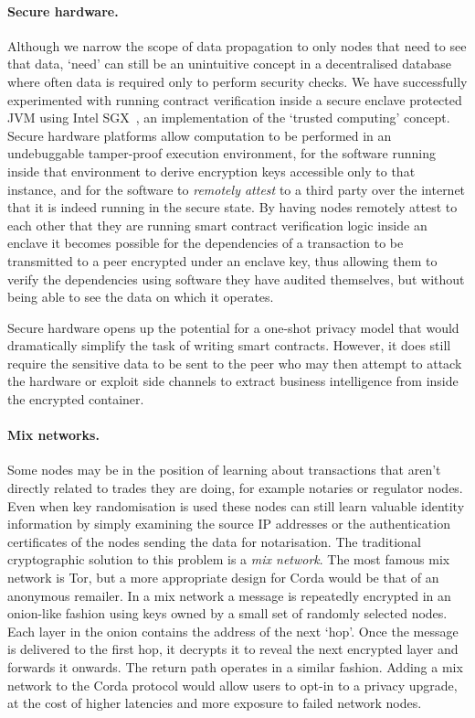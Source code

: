 \documentclass{article}
\begin{document}
\paragraph{Secure hardware.}Although we narrow the scope of data propagation to only nodes that need to see that
data, `need' can still be an unintuitive concept in a decentralised database where often data is required only
to perform security checks. We have successfully experimented with running contract verification inside a
secure enclave protected JVM using Intel SGX\texttrademark~, an implementation of the `trusted computing'
concept\cite{mitchell2005trusted}. Secure hardware platforms allow computation to be performed
in an undebuggable tamper-proof execution environment, for the software running inside that environment to derive
encryption keys accessible only to that instance, and for the software to \emph{remotely attest} to a third party
over the internet that it is indeed running in the secure state. By having nodes remotely attest to each other
that they are running smart contract verification logic inside an enclave it becomes possible for the dependencies
of a transaction to be transmitted to a peer encrypted under an enclave key, thus allowing them to
verify the dependencies using software they have audited themselves, but without being able to see the data on
which it operates.

Secure hardware opens up the potential for a one-shot privacy model that would dramatically simplify the task
of writing smart contracts. However, it does still require the sensitive data to be sent to the peer
who may then attempt to attack the hardware or exploit side channels to extract business intelligence from
inside the encrypted container.

\paragraph{Mix networks.}Some nodes may be in the position of learning about transactions that aren't directly related
to trades they are doing, for example notaries or regulator nodes. Even when key randomisation is used these nodes can
still learn valuable identity information by simply examining the source IP addresses or the authentication certificates
of the nodes sending the data for notarisation. The traditional cryptographic solution to this problem is a
\emph{mix network}\cite{Chaum:1981:UEM:358549.358563}. The most famous mix network is Tor, but a more appropriate design
for Corda would be that of an anonymous remailer. In a mix network a message is repeatedly encrypted in an onion-like
fashion using keys owned by a small set of randomly selected nodes. Each layer in the onion contains the address of the
next `hop'. Once the message is delivered to the first hop, it decrypts it to reveal the next encrypted layer and
forwards it onwards. The return path operates in a similar fashion. Adding a mix network to the Corda protocol
would allow users to opt-in to a privacy upgrade, at the cost of higher latencies and more exposure to failed network
nodes.
\end{document}
